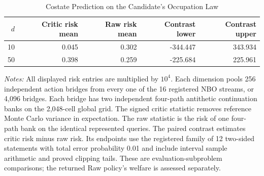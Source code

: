 \begin{table}[!htbp]
\centering
\footnotesize
\caption{Costate Prediction on the Candidate's Occupation Law}\label{tab:r15mechanismevaluation}
\begin{tabular}{rrrrr}
\toprule
$d$ & Critic risk mean & Raw risk mean & Contrast lower & Contrast upper \\
\midrule
10 & 0.045 & 0.302 & -344.447 & 343.934 \\
50 & 0.398 & 0.259 & -225.684 & 225.961 \\
\bottomrule
\end{tabular}
\begin{minipage}{0.97\linewidth}\footnotesize
\emph{Notes:} All displayed risk entries are multiplied by $10^4$. Each dimension pools 256 independent action bridges from every one of the 16 registered NBO streams, or 4,096 bridges. Each bridge has two independent four-path antithetic continuation banks on the 2,048-cell global grid. The signed critic statistic removes reference Monte Carlo variance in expectation. The raw statistic is the risk of one four-path bank on the identical represented queries. The paired contrast estimates critic risk minus raw risk. Its endpoints use the registered family of 12 two-sided statements with total error probability 0.01 and include interval sample arithmetic and proved clipping tails. These are evaluation-subproblem comparisons; the returned Raw policy's welfare is assessed separately.
\end{minipage}
\end{table}
